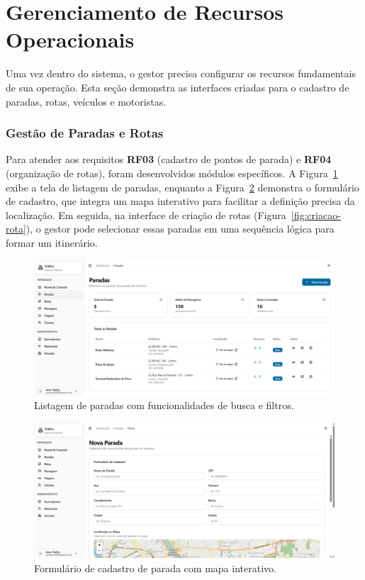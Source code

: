 \section{Gerenciamento de Recursos Operacionais}

Uma vez dentro do sistema, o gestor precisa configurar os recursos fundamentais de sua operação. Esta seção demonstra as interfaces criadas para o cadastro de paradas, rotas, veículos e motoristas.

\subsubsection{Gestão de Paradas e Rotas}
Para atender aos requisitos \textbf{RF03} (cadastro de pontos de parada) e \textbf{RF04} (organização de rotas), foram desenvolvidos módulos específicos. A Figura~\ref{fig:listagem-paradas} exibe a tela de listagem de paradas, enquanto a Figura~\ref{fig:formulario-parada} demonstra o formulário de cadastro, que integra um mapa interativo para facilitar a definição precisa da localização. Em seguida, na interface de criação de rotas (Figura~\ref{fig:criacao-rota}), o gestor pode selecionar essas paradas em uma sequência lógica para formar um itinerário.

\begin{figure}[H]
 \centering
 \includegraphics[width=1\textwidth]{imagens/listagem-paradas.png}
 \caption{Listagem de paradas com funcionalidades de busca e filtros.}
 \label{fig:listagem-paradas}
\end{figure}

\begin{figure}[H]
 \centering
 \includegraphics[width=1\textwidth]{imagens/formulario-parada.png}
 \caption{Formulário de cadastro de parada com mapa interativo.}
 \label{fig:formulario-parada}
\end{figure}

